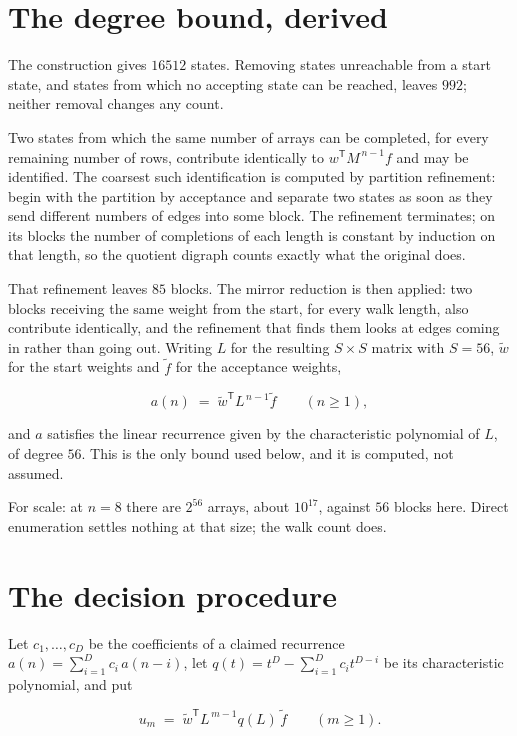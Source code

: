 \documentclass[11pt]{article}
\theoremstyle{definition}
\begin{document}
\section{The degree bound, derived}

The construction gives $16512$ states. Removing states unreachable from a start state, and states from which no accepting state can be reached, leaves $992$; neither removal changes any count.

Two states from which the same number of arrays can be completed, for every remaining number of rows, contribute identically to $w^{\mathsf T}M^{\,n-1}f$ and may be identified. The coarsest such identification is computed by partition refinement: begin with the partition by acceptance and separate two states as soon as they send different numbers of edges into some block. The refinement terminates; on its blocks the number of completions of each length is constant by induction on that length, so the quotient digraph counts exactly what the original does.

That refinement leaves $85$ blocks. The mirror reduction is then applied: two blocks receiving the same weight from the start, for every walk length, also contribute identically, and the refinement that finds them looks at edges coming in rather than going out. Writing $L$ for the resulting $S \times S$ matrix with $S = 56$, $\tilde w$ for the start weights and $\tilde f$ for the acceptance weights,

\[a(n) \;=\; \tilde w^{\mathsf T} L^{\,n-1} \tilde f \qquad (n \ge 1),\]

and $a$ satisfies the linear recurrence given by the characteristic polynomial of $L$, of degree $56$. This is the only bound used below, and it is computed, not assumed.

For scale: at $n = 8$ there are $2^{56}$ arrays, about $10^{17}$, against $56$ blocks here. Direct enumeration settles nothing at that size; the walk count does.

\section{The decision procedure}

Let $c_1,\dots,c_D$ be the coefficients of a claimed recurrence $a(n) = \sum_{i=1}^{D} c_i\,a(n-i)$, let $q(t) = t^{D} - \sum_{i=1}^{D} c_i t^{D-i}$ be its characteristic polynomial, and put

\[u_m \;=\; \tilde w^{\mathsf T} L^{\,m-1} q(L)\,\tilde f \qquad (m \ge 1).\]
\end{document}
